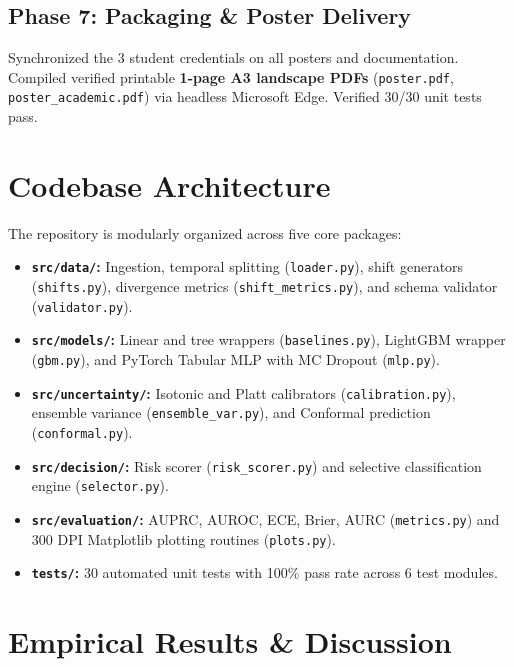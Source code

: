 \documentclass[10pt,a4paper,twocolumn]{article}
\begin{document}
\subsection{Phase 7: Packaging \& Poster Delivery}
Synchronized the 3 student credentials on all posters and documentation. Compiled verified printable \textbf{1-page A3 landscape PDFs} (\texttt{poster.pdf}, \texttt{poster\_academic.pdf}) via headless Microsoft Edge. Verified 30/30 unit tests pass.

\section{Codebase Architecture}

The repository is modularly organized across five core packages:
\begin{itemize}
  \item \textbf{\texttt{src/data/}:} Ingestion, temporal splitting (\texttt{loader.py}), shift generators (\texttt{shifts.py}), divergence metrics (\texttt{shift\_metrics.py}), and schema validator (\texttt{validator.py}).
  \item \textbf{\texttt{src/models/}:} Linear and tree wrappers (\texttt{baselines.py}), LightGBM wrapper (\texttt{gbm.py}), and PyTorch Tabular MLP with MC Dropout (\texttt{mlp.py}).
  \item \textbf{\texttt{src/uncertainty/}:} Isotonic and Platt calibrators (\texttt{calibration.py}), ensemble variance (\texttt{ensemble\_var.py}), and Conformal prediction (\texttt{conformal.py}).
  \item \textbf{\texttt{src/decision/}:} Risk scorer (\texttt{risk\_scorer.py}) and selective classification engine (\texttt{selector.py}).
  \item \textbf{\texttt{src/evaluation/}:} AUPRC, AUROC, ECE, Brier, AURC (\texttt{metrics.py}) and 300 DPI Matplotlib plotting routines (\texttt{plots.py}).
  \item \textbf{\texttt{tests/}:} 30 automated unit tests with 100\% pass rate across 6 test modules.
\end{itemize}

\section{Empirical Results \& Discussion}
\end{document}

